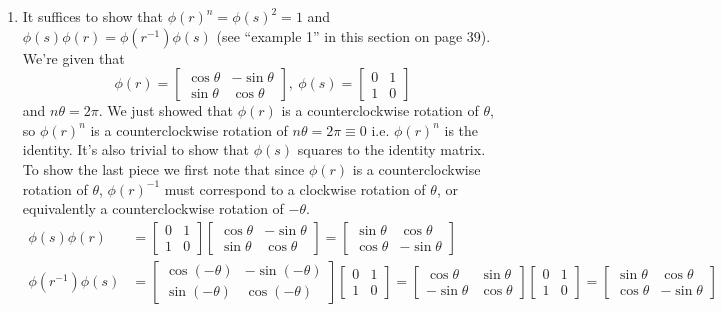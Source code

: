 \documentclass[]{article}
\begin{document}
\begin{enumerate}
\begin{enumerate}
\item It suffices to show that $\phi(r)^n = \phi(s)^2 = 1$ and $\phi(s)\phi(r) = \phi(r^{-1})\phi(s)$ (see ``example 1'' in this section on page 39). We're given that
\begin{equation}
\phi(r) = \begin{bmatrix}\cos\theta & -\sin\theta \\ \sin\theta & \cos\theta\end{bmatrix},\ \phi(s) = \begin{bmatrix}0&1\\1&0\end{bmatrix}
\end{equation}
and $n\theta = 2\pi$. We just showed that $\phi(r)$ is a counterclockwise rotation of $\theta$, so $\phi(r)^n$ is a counterclockwise rotation of $n\theta = 2\pi \equiv 0$ i.e. $\phi(r)^n$ is the identity. It's also trivial to show that $\phi(s)$ squares to the identity matrix. To show the last piece we first note that since $\phi(r)$ is a counterclockwise rotation of $\theta$, $\phi(r)^{-1}$ must correspond to a clockwise rotation of $\theta$, or equivalently a counterclockwise rotation of $-\theta$.
\begin{align}
\phi(s)\phi(r) &= \begin{bmatrix}0&1\\1&0\end{bmatrix}\begin{bmatrix}\cos\theta & -\sin\theta \\ \sin\theta & \cos\theta\end{bmatrix} = \begin{bmatrix}\sin\theta & \cos\theta \\ \cos\theta & -\sin\theta\end{bmatrix} \\
\phi(r^{-1})\phi(s) &= \begin{bmatrix}\cos(-\theta) & -\sin(-\theta) \\ \sin(-\theta) & \cos(-\theta)\end{bmatrix}\begin{bmatrix}0&1\\1&0\end{bmatrix} = \begin{bmatrix}\cos\theta & \sin\theta \\ -\sin\theta & \cos\theta\end{bmatrix}\begin{bmatrix}0&1\\1&0\end{bmatrix} = \begin{bmatrix}\sin\theta & \cos\theta \\ \cos\theta & -\sin\theta\end{bmatrix}

\end{align}
\end{enumerate}
\end{enumerate}
\end{document}
